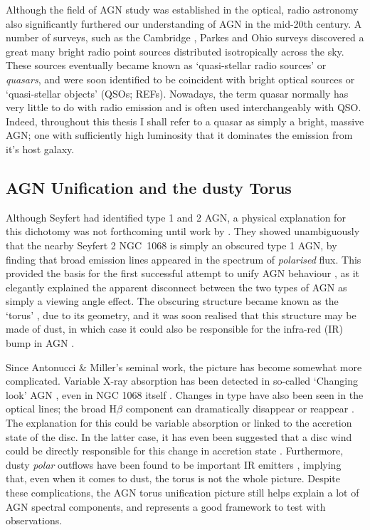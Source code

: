 Although the field of AGN study was established in the optical, 
radio astronomy also significantly furthered our understanding of AGN
in the mid-20th century. A number of surveys, such as the Cambridge \citep{edge1959}, 
Parkes \citep{ekers1969} and Ohio \citep{ehman1970} surveys discovered a great many 
bright radio point sources distributed isotropically across the sky.
These sources eventually became known as `quasi-stellar radio sources'
or {\em quasars}, and were soon identified to be coincident with bright optical
sources or `quasi-stellar objects' (QSOs; REFs). 
Nowadays, the term quasar normally has very little to do with 
radio emission and is often used interchangeably with QSO. 
Indeed, throughout this thesis I shall refer to a quasar as simply a bright, 
massive AGN; one with sufficiently high luminosity that it dominates the emission 
from it's host galaxy. 

\subsection{AGN Unification and the dusty Torus}

Although Seyfert had identified type 1 and 2 AGN, a physical explanation
for this dichotomy was not forthcoming until work by \cite{antonucci1985}.
They showed unambiguously that the nearby Seyfert 2 NGC~1068 is simply an obscured
type 1 AGN, by finding that broad emission lines appeared in the spectrum of
{\em polarised} flux. This provided the basis for the first successful attempt
to unify AGN behaviour \citep{UP95}, as it elegantly explained the apparent disconnect between
the two types of AGN as simply a viewing angle effect. The obscuring structure became known as 
the `torus' \citep{krolik1986}, due to its geometry, and it was soon realised that this structure
may be made of dust, in which case it could also be responsible for the infra-red (IR)
bump in AGN \citep{neugebauer1979}.

Since Antonucci \& Miller's seminal work, 
the picture has become somewhat more complicated. 
Variable X-ray absorption has been detected in so-called `Changing look'
AGN \citep{matt2003,puccetti2007}, even in NGC 1068 itself \citep{marinucci2016}.
Changes in type have also been seen in the optical lines; 
the broad H$\beta$ component can dramatically disappear or reappear
\citep[e.g.][]{tohline1976,cohen1986,denney2014}. 
The explanation for this could be variable absorption \citep{elitzur2012}
or linked to the accretion state of the disc. In the latter case,
it has even been suggested that a disc wind could be directly responsible
for this change in accretion state \citep{elitzur2014}.
Furthermore, dusty {\em polar} outflows
have been found to be important IR emitters \citep{hoenig2013}, implying
that, even when it comes to dust, the torus is not the whole picture.
Despite these complications, the AGN torus unification picture still helps 
explain a lot of AGN spectral components, and represents a good framework 
to test with observations. 


